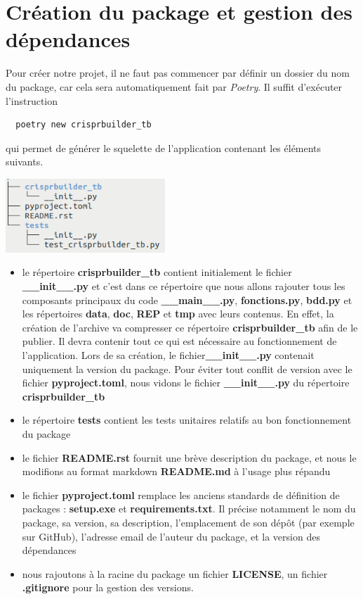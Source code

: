 \documentclass[twoside,a4paper,11pt,frenchb,openany]{report}
\begin{document}
\section{Création du package et gestion des dépendances}

Pour créer notre projet, il ne faut pas commencer par définir un dossier du nom du package, car cela sera automatiquement fait par \textit{Poetry}. Il suffit d'exécuter l'instruction

\begin{verbatim}
  poetry new crisprbuilder_tb
\end{verbatim}

qui permet de générer le squelette de l'application contenant les éléments suivants.

\includegraphics[width=6cm]{nom_package_tree.png}

\begin{itemize}
\item le répertoire \textbf{crisprbuilder\_tb} contient initialement le fichier \textbf{\_\_init\_\_.py} et c'est dans ce répertoire que nous allons rajouter tous les composants principaux du code  \textbf{\_\_main\_\_.py}, \textbf{fonctions.py}, \textbf{bdd.py} et les répertoires \textbf{data}, \textbf{doc}, \textbf{REP} et \textbf{tmp} avec leurs contenus. En effet, la création de l'archive va compresser ce répertoire \textbf{crisprbuilder\_tb} afin de le publier. Il devra contenir tout ce qui est nécessaire au fonctionnement de l'application. Lors de sa création, le fichier\textbf{\_\_init\_\_.py} contenait uniquement la version du package. Pour éviter tout conflit de version avec le fichier \textbf{pyproject.toml}, nous vidons le fichier \textbf{\_\_init\_\_.py} du répertoire \textbf{crisprbuilder\_tb}
\item le répertoire \textbf{tests} contient les tests unitaires relatifs au bon fonctionnement du package
\item le fichier \textbf{README.rst} fournit une brève description du package, et nous le modifions au format markdown \textbf{README.md} à l'usage plus répandu
\item le fichier \textbf{pyproject.toml} remplace les anciens standards de définition de packages : \textbf{setup.exe} et \textbf{requirements.txt}. Il précise notamment le nom du package, sa version, sa description, l’emplacement de son dépôt (par exemple sur GitHub), l’adresse email de l’auteur du package, et la version des dépendances
\item nous rajoutons à la racine du package un fichier \textbf{LICENSE}, un fichier \textbf{.gitignore} pour la gestion des versions. 
\end{itemize}
\end{document}
